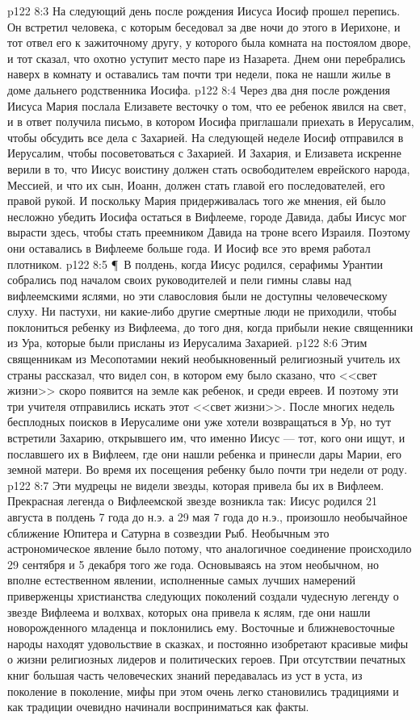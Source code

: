 \vs p122 8:3 На следующий день после рождения Иисуса Иосиф прошел перепись. Он встретил человека, с которым беседовал за две ночи до этого в Иерихоне, и тот отвел его к зажиточному другу, у которого была комната на постоялом дворе, и тот сказал, что охотно уступит место паре из Назарета. Днем они перебрались наверх в комнату и оставались там почти три недели, пока не нашли жилье в доме дальнего родственника Иосифа.
\vs p122 8:4 Через два дня после рождения Иисуса Мария послала Елизавете весточку о том, что ее ребенок явился на свет, и в ответ получила письмо, в котором Иосифа приглашали приехать в Иерусалим, чтобы обсудить все дела с Захарией. На следующей неделе Иосиф отправился в Иерусалим, чтобы посоветоваться с Захарией. И Захария, и Елизавета искренне верили в то, что Иисус воистину должен стать освободителем еврейского народа, Мессией, и что их сын, Иоанн, должен стать главой его последователей, его правой рукой. И поскольку Мария придерживалась того же мнения, ей было несложно убедить Иосифа остаться в Вифлееме, городе Давида, дабы Иисус мог вырасти здесь, чтобы стать преемником Давида на троне всего Израиля. Поэтому они оставались в Вифлееме больше года. И Иосиф все это время работал плотником.
\vs p122 8:5 \P\ В полдень, когда Иисус родился, серафимы Урантии собрались под началом своих руководителей и пели гимны славы над вифлеемскими яслями, но эти славословия были не доступны человеческому слуху. Ни пастухи, ни какие\hyp{}либо другие смертные люди не приходили, чтобы поклониться ребенку из Вифлеема, до того дня, когда прибыли некие священники из Ура, которые были присланы из Иерусалима Захарией.
\vs p122 8:6 Этим священникам из Месопотамии некий необыкновенный религиозный учитель их страны рассказал, что видел сон, в котором ему было сказано, что <<свет жизни>> скоро появится на земле как ребенок, и среди евреев. И поэтому эти три учителя отправились искать этот <<свет жизни>>. После многих недель бесплодных поисков в Иерусалиме они уже хотели возвращаться в Ур, но тут встретили Захарию, открывшего им, что именно Иисус --- тот, кого они ищут, и пославшего их в Вифлеем, где они нашли ребенка и принесли дары Марии, его земной матери. Во время их посещения ребенку было почти три недели от роду.
\vs p122 8:7 Эти мудрецы не видели звезды, которая привела бы их в Вифлеем. Прекрасная легенда о Вифлеемской звезде возникла так: Иисус родился 21 августа в полдень 7 года до н.э. а 29 мая 7 года до н.э., произошло необычайное сближение Юпитера и Сатурна в созвездии Рыб. Необычным это астрономическое явление было потому, что аналогичное соединение происходило 29 сентября и 5 декабря того же года. Основываясь на этом необычном, но вполне естественном явлении, исполненные самых лучших намерений приверженцы христианства следующих поколений создали чудесную легенду о звезде Вифлеема и волхвах, которых она привела к яслям, где они нашли новорожденного младенца и поклонились ему. Восточные и ближневосточные народы находят удовольствие в сказках, и постоянно изобретают красивые мифы о жизни религиозных лидеров и политических героев. При отсутствии печатных книг большая часть человеческих знаний передавалась из уст в уста, из поколение в поколение, мифы при этом очень легко становились традициями и как традиции очевидно начинали восприниматься как факты.
